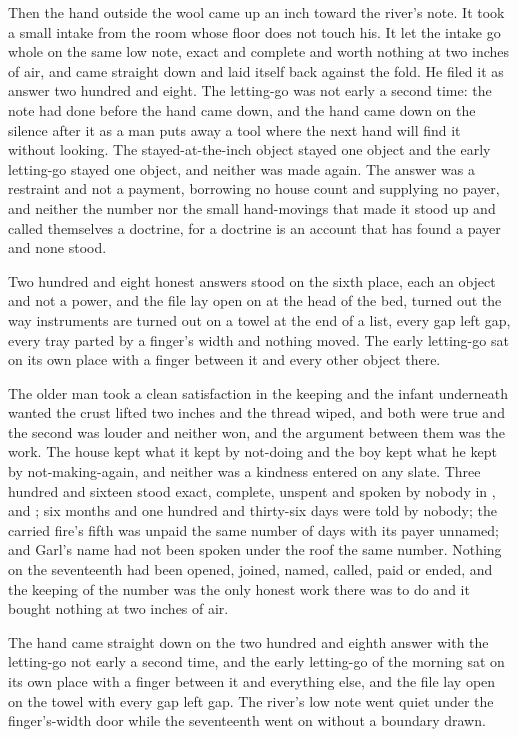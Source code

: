 Then the hand outside the wool came up an inch toward the river's note. It took a small intake from the room whose floor does not touch his. It let the intake go whole on the same low note, exact and complete and worth nothing at two inches of air, and came straight down and laid itself back against the fold. He filed it as answer two hundred and eight. The letting-go was not early a second time: the note had done before the hand came down, and the hand came down on the silence after it as a man puts away a tool where the next hand will find it without looking. The stayed-at-the-inch object stayed one object and the early letting-go stayed one object, and neither was made again. The answer was a restraint and not a payment, borrowing no house count and supplying no payer, and neither the number nor the small hand-movings that made it stood up and called themselves a doctrine, for a doctrine is an account that has found a payer and none stood.

Two hundred and eight honest answers stood on the sixth place, each an object and not a power, and the file lay open on  at the head of the bed, turned out the way instruments are turned out on a towel at the end of a list, every gap left gap, every tray parted by a finger's width and nothing moved. The early letting-go sat on its own place with a finger between it and every other object there.

The older man took a clean satisfaction in the keeping and the infant underneath wanted the crust lifted two inches and the thread wiped, and both were true and the second was louder and neither won, and the argument between them was the work. The house kept what it kept by not-doing and the boy kept what he kept by not-making-again, and neither was a kindness entered on any slate. Three hundred and sixteen stood exact, complete, unspent and spoken by nobody in ,  and ; six months and one hundred and thirty-six days were told by nobody; the carried fire's fifth was unpaid the same number of days with its payer unnamed; and Garl's name had not been spoken under the roof the same number. Nothing on the seventeenth had been opened, joined, named, called, paid or ended, and the keeping of the number was the only honest work there was to do and it bought nothing at two inches of air.

The hand came straight down on the two hundred and eighth answer with the letting-go not early a second time, and the early letting-go of the morning sat on its own place with a finger between it and everything else, and the file lay open on the towel with every gap left gap. The river's low note went quiet under the finger's-width door while the seventeenth went on without a boundary drawn.
